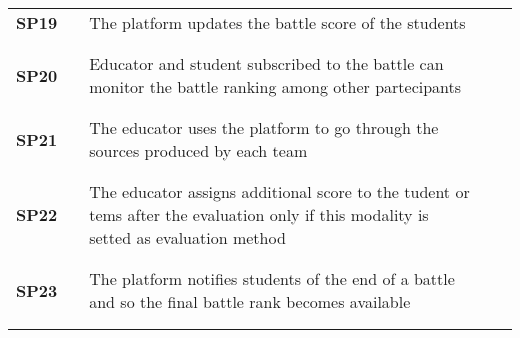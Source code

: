 \begin{longtable}[H]{l l p{8.5cm} l l}
     \textbf{SP19}             & \vline & The platform updates the battle score of the students                                                                                 & \vline &                        \\
                              &        &                                                                                                                                       &        &                        \\\hline & & & & \\
    \textbf{SP20}             & \vline & Educator and student subscribed to the battle can monitor the battle ranking among other partecipants                                 & \vline &                        \\
                              &        &                                                                                                                                       &        &                        \\\hline & & & & \\
    \textbf{SP21}             & \vline & The educator uses the platform to go through the sources produced by each team                                                        & \vline &                        \\
                              &        &                                                                                                                                       &        &                        \\\hline & & & & \\
    \textbf{SP22}             & \vline & The educator assigns additional score to the tudent or tems after the evaluation only if this modality is setted as evaluation method & \vline &                        \\
                              &        &                                                                                                                                       &        &                        \\\hline & & & & \\
    \textbf{SP23}             & \vline & The platform notifies students of the end of a battle and so the final battle rank becomes available                                  & \vline &                        \\
                              &        &                                                                                                                                       &        &                        \\\hline & & & & \\

\end{longtable}
